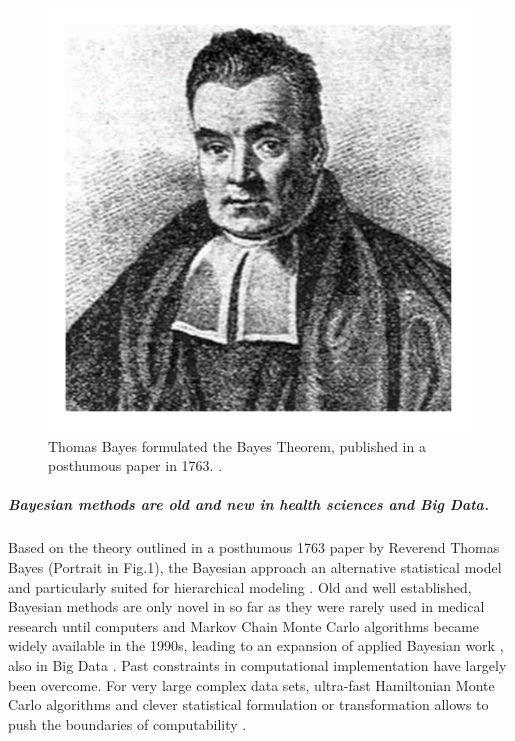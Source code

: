 \documentclass[11pt,notitlepage]{article}
\begin{document}
\begin{figure} %
 \vspace{-20pt}
 \includegraphics[scale=0.15]{Figures/Thomas_Bayes.pdf}
  \vspace{-10pt}
 \caption{\footnotesize Thomas Bayes formulated the Bayes Theorem, published in a posthumous paper in 1763. \cite{Thomas_Bayes}.}
 \vspace{-20pt}
\end{figure} 


\subparagraph*{Bayesian methods are old and new in health sciences and Big Data.}
Based on the theory outlined in a posthumous 1763 paper by Reverend Thomas Bayes (Portrait in Fig.1)\cite{Thomas_Bayes}, the Bayesian approach an alternative statistical model and particularly suited for hierarchical modeling \cite{Carlin_1349763,Sutton_2012}. Old and well established, Bayesian methods are only novel in so far as they were rarely used in medical research until computers and Markov Chain Monte Carlo algorithms became widely available in the 1990s, leading to an expansion of applied Bayesian work \cite{Ashby_16947924,Spiegelhalter_11134920}, also in Big Data \cite{Yoo_24987556}. Past constraints in computational implementation have largely been overcome. For very large complex data sets,  ultra-fast Hamiltonian Monte Carlo algorithms \cite{Stan_Software_2014} and clever statistical formulation or transformation allows to push the boundaries of computability \cite{Gelman-Hill_2014}.  
\end{document}
